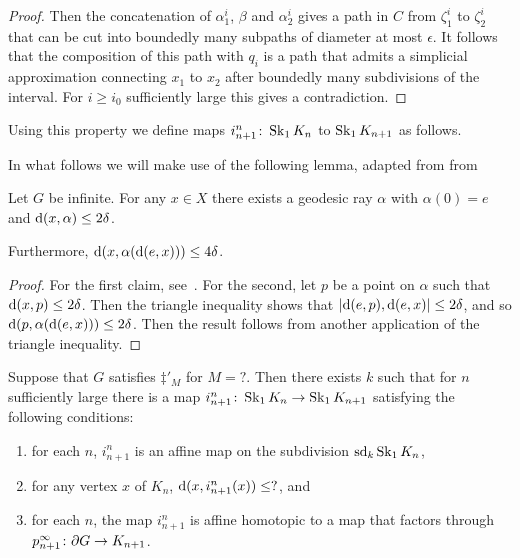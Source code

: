 \documentclass[a4paper]{article}
\begin{document}
\begin{proof}
  Then the concatenation of $\alpha_1^i$, $\beta$ and $\alpha_2^i$ gives a path
  in $C$ from $\zeta_1^i$ to $\zeta_2^i$ that can be cut into boundedly many
  subpaths of diameter at most $\epsilon$. It follows that the composition of
  this path with $q_i$ is a path that admits a simplicial approximation
  connecting $x_1$ to $x_2$ after boundedly many subdivisions of the interval.
  For $i \geq i_0$ sufficiently large this gives a contradiction.
\end{proof}

Using this property we define maps $i^n_{n+1}\colon \operatorname{Sk}_1 K_n$ to
$\operatorname{Sk}_1K_{n+1}$ as follows.

In what follows we will make use of the following lemma, adapted from
from~\cite{bestvinamess91}

\begin{lemma}\cite{bestvinamess91}\label{lem:near_geod_rays}
  Let $G$ be infinite. For any $x \in X$ there exists a geodesic ray $\alpha$ 
  with $\alpha(0) = e$ and $\operatorname{d}(x,\alpha) \leq 2\delta$. 
  
  Furthermore, $\operatorname{d}(x, \alpha(\operatorname{d}(e,x))) \leq 4\delta$.
\end{lemma}

\begin{proof}
  For the first claim, see~\cite{bestvinamess91}. For the second, let $p$ be a 
  point on $\alpha$ such that $\operatorname{d}(x, p) \leq 2\delta$. Then the triangle 
  inequality shows that $\left|\operatorname{d}(e,p), \operatorname{d}(e,x)\right| \leq 2\delta$, and 
  so $\operatorname{d}(p, \alpha(\operatorname{d}(e,x))) \leq 2\delta$. Then the result 
  follows from another application of the triangle inequality.
\end{proof}

\begin{proposition}
  Suppose that $G$ satisfies $\ddag'_M$ for $M = ?$. Then there exists $k$
  such that for $n$ sufficiently large there is a map
  $i^n_{n+1}\colon \operatorname{Sk}_1 K_n \to \operatorname{Sk}_1 K_{n+1}$ satisfying the following
  conditions:
  \begin{enumerate}
    \item for each $n$, $i^n_{n+1}$ is an affine map on the subdivision
      $\operatorname{sd}_k\operatorname{Sk}_1 K_n$,
    \item for any vertex $x$ of $K_n$, $\operatorname{d}(x, i^n_{n+1}(x)) \leq ?$, and
    \item for each $n$, the map $i^n_{n+1}$ is affine homotopic to a map that
      factors through $p^\infty_{n+1}\colon \partial G \to K_{n+1}$.
  \end{enumerate}
\end{proposition}
\end{document}
